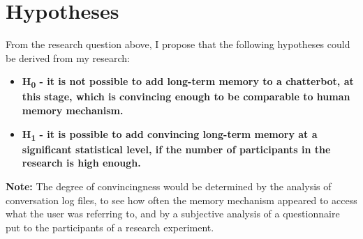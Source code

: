 \section*{Hypotheses}

From the research question above, I propose that the following hypotheses could be derived from my research:

\begin{itemize}
	\item \textbf{H\textsubscript{0} - it is not possible to add long-term memory to a chatterbot, at this stage, which is convincing enough to be comparable to human memory mechanism.}
	\item \textbf{H\textsubscript{1} - it is possible to add convincing long-term memory at a significant statistical level, if the number of participants in the research is high enough.}
\end{itemize}
\textbf{Note:} The degree of convincingness would be determined by the analysis of conversation log files, to see how often the memory mechanism appeared to access what the user was referring to, and by a subjective analysis of a questionnaire put to the participants of a research experiment.	

